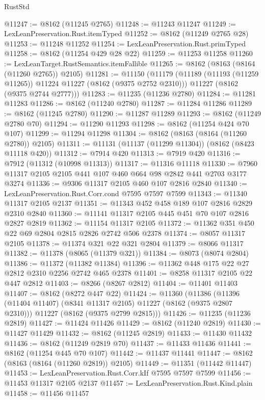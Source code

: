 \begin{lexlean}{RustStd}
\begin{coremodule}
@11247 := @8162 (@11245 @2765)
@11248 := @11243 @11247
@11249 := LexLeanPreservation.Rust.itemTyped
@11252 := @8162 (@11249 @2765 @28)
@11253 := @11248 @11252
@11254 := LexLeanPreservation.Rust.primTyped
@11258 := @8162 (@11254 @429 @28 @22)
@11259 := @11253 @11258
@11260 := LexLeanTarget.RustSemantics.itemFallible
@11265 := @8162 (@8163 (@8164 (@11260 @2765)) @2105)
@11281 := @11150
    (@11179
      (@11189 (@11193 (@11259 @11265)) @11224 @11227 (@8162 (@9375 @2752 @2310)))
      @11227
      (@8162 (@9375 @2744 @2777)))
@11283 := @11235 (@11236 @2780)
@11284 := @11281 @11283
@11286 := @8162 (@11240 @2780)
@11287 := @11284 @11286
@11289 := @8162 (@11245 @2780)
@11290 := @11287 @11289
@11293 := @8162 (@11249 @2780 @70)
@11294 := @11290 @11293
@11298 := @8162 (@11254 @424 @70 @107)
@11299 := @11294 @11298
@11304 := @8162 (@8163 (@8164 (@11260 @2780)) @2105)
@11311 := @11131 (@11137 (@11299 @11304)) (@8162 (@8423 @11118 @420))
@11312 := @7914 @420
@11313 := @7919 @420
@11316 := @7912 (@11312 (@10998 @11313))
@11317 := @11316 @11118
@11330 := @7960 @11317 @2105 @2105 @441 @107 @460 @664 @98 @2842 @441 @2703 @3177 @3274
@11336 := @9306 @11317 @2105 @460 @107 @2816 @2840
@11340 := LexLeanPreservation.Rust.Corr.cond @7595 @7597 @7599
@11343 := @11340 @11317 @2105 @2137
@11351 := @11343 @452 @458 @189 @107 @2816 @2829 @2310 @2840
@11360 := @11141 @11317 @2105 @445 @451 @70 @107 @2816 @2827 @2819
@11362 := @11154 @11317 @2105
@11372 := @11362 @351 @450 @22 @69 @2804 @2815 @2826 @2742 @506 @2378
@11374 := @8057 @11317 @2105
@11378 := @11374 @321 @22 @321 @2804
@11379 := @8066 @11317
@11382 := @11378 (@8065 (@11379 @321))
@11384 := @8073 (@8074 @2804)
@11386 := @11372 (@11382 @11384)
@11396 := @11362 @448 @175 @22 @27 @2812 @2310 @2256 @2742 @465 @2378
@11401 := @8258 @11317 @2105 @22 @447 @2812
@11403 := @8266 (@8267 @2812)
@11404 := @11401 @11403
@11407 := @8162 (@8272 @447 @22)
@11424 := @11360
    (@11386
      (@11396 (@11404 @11407) (@8341 @11317 @2105) @11227 (@8162 (@9375 @2807 @2310)))
      @11227
      (@8162 (@9375 @2799 @2815)))
@11426 := @11235 (@11236 @2819)
@11427 := @11424 @11426
@11429 := @8162 (@11240 @2819)
@11430 := @11427 @11429
@11432 := @8162 (@11245 @2819)
@11433 := @11430 @11432
@11436 := @8162 (@11249 @2819 @70)
@11437 := @11433 @11436
@11441 := @8162 (@11254 @445 @70 @107)
@11442 := @11437 @11441
@11447 := @8162 (@8163 (@8164 (@11260 @2819)) @2105)
@11449 := @11351 (@11442 @11447)
@11453 := LexLeanPreservation.Rust.Corr.kIf @7595 @7597 @7599
@11456 := @11453 @11317 @2105 @2137
@11457 := LexLeanPreservation.Rust.Kind.plain
@11458 := @11456 @11457

\end{coremodule}
\end{lexlean}
